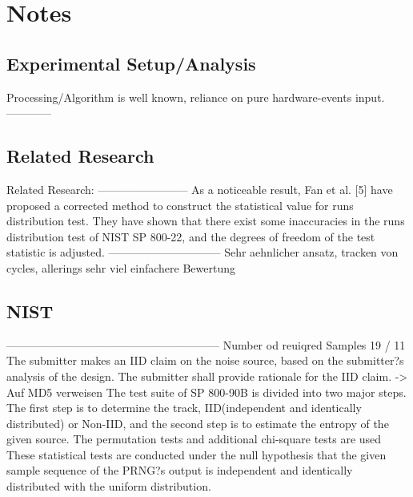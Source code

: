 \chapter{Notes}
\label{cha:notes}

\section{Experimental Setup/Analysis}
Processing/Algorithm is well known, reliance on pure hardware-events input.
------------

\section{Related Research}
 Related Research: 
 ------------------------
 As a noticeable result, Fan et al. [5]
 have proposed a corrected method to construct the statistical
 value for runs distribution test. They have shown that there
 exist some inaccuracies in the runs distribution test of NIST
 SP 800-22, and the degrees of freedom of the test statistic
 is adjusted. 
  \cite{kangadditional}
------------------------------
 Sehr aehnlicher ansatz, tracken von cycles, allerings sehr viel einfachere Bewertung 
 \cite{yoo2017analysis}

\section{NIST}



---------------------------------------------------------
 Number od reuiqred Samples 19 / 11 \cite{turan2018nist} 
The submitter makes an IID claim on the noise source, based on the submitter?s analysis of the design. The submitter shall provide rationale for the IID claim. \cite{turan2018nist} -> Auf MD5 verweisen
 The test suite of SP 800-90B is divided into two major steps. The first step is to determine the track, IID(independent and identically distributed) or Non-IID, and the second step is to estimate the entropy of the given source. The permutation tests and additional chi-square tests are used \cite{kangadditional}
These statistical tests are conducted under the null hypothesis that the
given sample sequence of the PRNG?s output is independent
and identically distributed with the uniform distribution.
 \cite{kangadditional}


